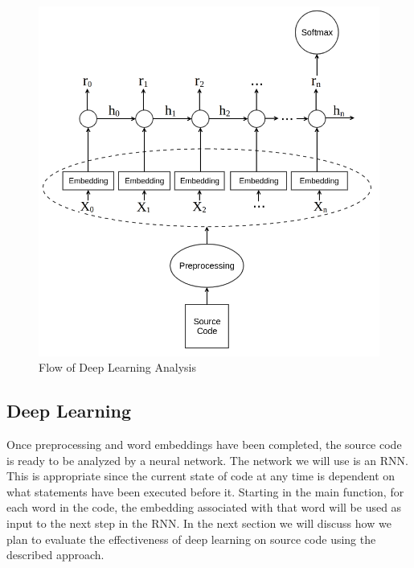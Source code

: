 \begin{figure}
   \centering
   \includegraphics[scale=.32]{figures/deeplearningflow.png}
   \caption{Flow of Deep Learning Analysis}
   \label{deeplearningflow}
\end{figure}

\subsection{Deep Learning}

Once preprocessing and word embeddings have been completed, the source code is ready to be analyzed by a neural network. The network we will use is an RNN. This is appropriate since the current state of code at any time is dependent on what statements have been executed before it. Starting in the main function, for each word in the code, the embedding associated with that word will be used as input to the next step in the RNN. In the next section we will discuss how we plan to evaluate the effectiveness of deep learning on source code using the described approach.




